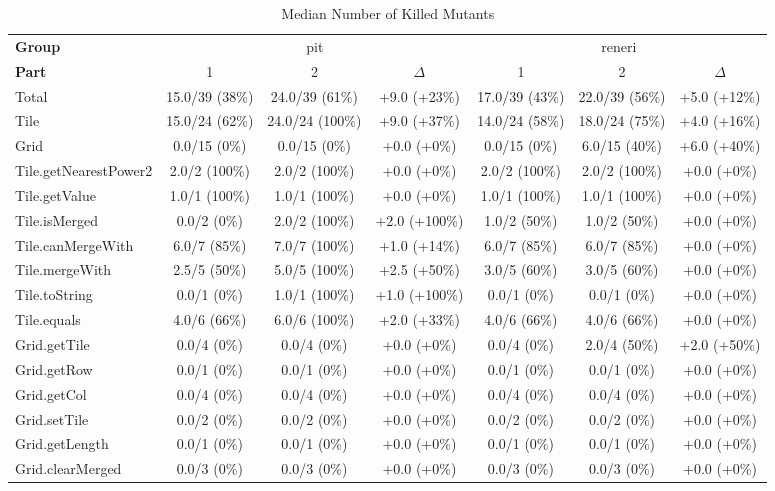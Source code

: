 \begin{sidewaystable}
\centering
\caption{Median Number of Killed Mutants}
\label{tab:median_number_of_killed_mutants}
\begin{tabular}{lcccccc}
\toprule
\textbf{Group} & \multicolumn{3}{c}{pit} & \multicolumn{3}{c}{reneri} \\
\textbf{Part} & 1 & 2 & $\Delta$ & 1 & 2 & $\Delta$ \\
\cmidrule(lr){1-1} \cmidrule(lr){2-4} \cmidrule(lr){5-7}
Total & 15.0/39 (38\%) & 24.0/39 (61\%) & +9.0 (+23\%) & 17.0/39 (43\%) & 22.0/39 (56\%) & +5.0 (+12\%) \\
\cmidrule(lr){1-1} \cmidrule(lr){2-4} \cmidrule(lr){5-7}
Tile & 15.0/24 (62\%) & 24.0/24 (100\%) & +9.0 (+37\%) & 14.0/24 (58\%) & 18.0/24 (75\%) & +4.0 (+16\%) \\
Grid & 0.0/15 (0\%) & 0.0/15 (0\%) & +0.0 (+0\%) & 0.0/15 (0\%) & 6.0/15 (40\%) & +6.0 (+40\%) \\
\cmidrule(lr){1-1} \cmidrule(lr){2-4} \cmidrule(lr){5-7}
Tile.getNearestPower2 & 2.0/2 (100\%) & 2.0/2 (100\%) & +0.0 (+0\%) & 2.0/2 (100\%) & 2.0/2 (100\%) & +0.0 (+0\%) \\
Tile.getValue & 1.0/1 (100\%) & 1.0/1 (100\%) & +0.0 (+0\%) & 1.0/1 (100\%) & 1.0/1 (100\%) & +0.0 (+0\%) \\
Tile.isMerged & 0.0/2 (0\%) & 2.0/2 (100\%) & +2.0 (+100\%) & 1.0/2 (50\%) & 1.0/2 (50\%) & +0.0 (+0\%) \\
Tile.canMergeWith & 6.0/7 (85\%) & 7.0/7 (100\%) & +1.0 (+14\%) & 6.0/7 (85\%) & 6.0/7 (85\%) & +0.0 (+0\%) \\
Tile.mergeWith & 2.5/5 (50\%) & 5.0/5 (100\%) & +2.5 (+50\%) & 3.0/5 (60\%) & 3.0/5 (60\%) & +0.0 (+0\%) \\
Tile.toString & 0.0/1 (0\%) & 1.0/1 (100\%) & +1.0 (+100\%) & 0.0/1 (0\%) & 0.0/1 (0\%) & +0.0 (+0\%) \\
Tile.equals & 4.0/6 (66\%) & 6.0/6 (100\%) & +2.0 (+33\%) & 4.0/6 (66\%) & 4.0/6 (66\%) & +0.0 (+0\%) \\
Grid.getTile & 0.0/4 (0\%) & 0.0/4 (0\%) & +0.0 (+0\%) & 0.0/4 (0\%) & 2.0/4 (50\%) & +2.0 (+50\%) \\
Grid.getRow & 0.0/1 (0\%) & 0.0/1 (0\%) & +0.0 (+0\%) & 0.0/1 (0\%) & 0.0/1 (0\%) & +0.0 (+0\%) \\
Grid.getCol & 0.0/4 (0\%) & 0.0/4 (0\%) & +0.0 (+0\%) & 0.0/4 (0\%) & 0.0/4 (0\%) & +0.0 (+0\%) \\
Grid.setTile & 0.0/2 (0\%) & 0.0/2 (0\%) & +0.0 (+0\%) & 0.0/2 (0\%) & 0.0/2 (0\%) & +0.0 (+0\%) \\
Grid.getLength & 0.0/1 (0\%) & 0.0/1 (0\%) & +0.0 (+0\%) & 0.0/1 (0\%) & 0.0/1 (0\%) & +0.0 (+0\%) \\
Grid.clearMerged & 0.0/3 (0\%) & 0.0/3 (0\%) & +0.0 (+0\%) & 0.0/3 (0\%) & 0.0/3 (0\%) & +0.0 (+0\%) \\
\bottomrule
\end{tabular}
\end{sidewaystable}
